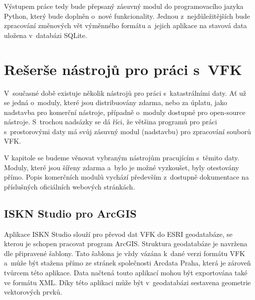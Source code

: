 \documentclass[a4paper,12pt,oneside]{book}
\begin{document}
Výstupem práce tedy bude přepsaný zásuvný modul do programovacího
jazyka Python, který bude doplněn o~nové funkcionality. Jednou
z~nejdůležitějších bude zpracování změnových vět výměnného formátu
a~jejich aplikace na stavová data uložena v~databázi SQLite.


\clearpage
\rhead{{\rightmark}}
\chapter{Rešerše nástrojů pro práci s~VFK}

V~současné době existuje několik nástrojů pro práci s~katastrálními
daty. Ať už se jedná o~moduly, které jsou distribuovány zdarma, nebo
za úplatu, jako nadstavba pro komerční nástroje, případně o~moduly
dostupné pro open-source nástroje. S~trochou nadsázky se dá říci, že
většina programů pro práci s~prostorovými daty má svůj zásuvný
modul (nadstavbu) pro zpracování souborů VFK.

V kapitole se budeme věnovat vybraným nástrojům pracujícím
s~těmito daty. Moduly, které jsou šířeny zdarma a~bylo je možné
vyzkoušet, byly otestovány přímo. Popis komerčních modulů vychází
především z~dostupně dokumentace na příslušných oficiálních webových
stránkách.

\section{ISKN Studio pro ArcGIS}
\label{l_iskn_studio}
Aplikace ISKN Studio slouží pro převod dat VFK do ESRI geodatabáze, se
kterou je schopen pracovat program ArcGIS. Struktura geodatabáze je
navržena dle připravené šablony. Tato šablona je vždy vázána k~dané
verzi formátu VFK a~může být stažena přímo ze stránek společnosti
Arcdata Praha, která je zároveň tvůrcem této aplikace. Data načtená
touto aplikací mohou být exportována také ve formátu
XML. Díky této aplikaci může být v~geodatabázi sestavena
geometrie vektorových prvků. \cite{iskn_studio}
\end{document}
